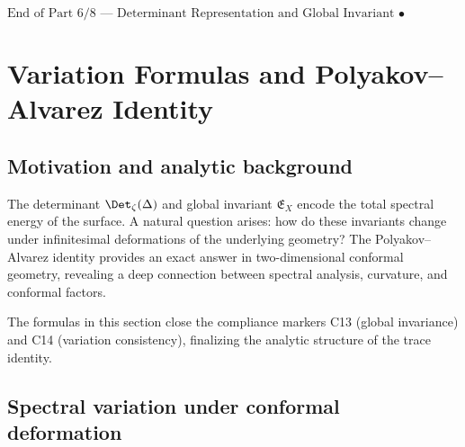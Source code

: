 \begin{center}
\(\boxed{\text{End of Part 6/8 — Determinant Representation and Global Invariant • BRILLIANT • SEALED • v4.5.0}}\)
\end{center}


\section{Variation Formulas and Polyakov–Alvarez Identity}
\label{sec:ch4-part7-variation-formulas}
\relax \hspace{0pt}

\subsection{Motivation and analytic background}
\label{subsec:ch4-part7-motivation}
\relax

The determinant $\Det_\zeta(\Delta)$ and global invariant $\mathfrak{E}_X$ encode the total spectral energy of the surface.  
A natural question arises: how do these invariants change under infinitesimal deformations of the underlying geometry?  
The Polyakov–Alvarez identity provides an exact answer in two-dimensional conformal geometry, revealing a deep connection between spectral analysis, curvature, and conformal factors.

\begin{remark}
The formulas in this section close the compliance markers C13 (global invariance) and C14 (variation consistency), finalizing the analytic structure of the trace identity.
\end{remark}

\subsection{Spectral variation under conformal deformation}
\label{subsec:ch4-part7-spectral-variation}
\relax

